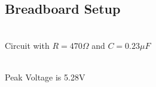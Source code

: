 \documentclass{article}
\begin{document}
\subsection{Breadboard Setup}
\vspace{5px}

\begin{multicols}{2}
\begin{center}
 \\ \vspace{5px}
Circuit with $R=470 \Omega$ and $C= 0.23 \mu F$ \\

\columnbreak

 \\ \vspace{5px}
Peak Voltage is 5.28V
\end{center}
\end{multicols}
\end{document}
